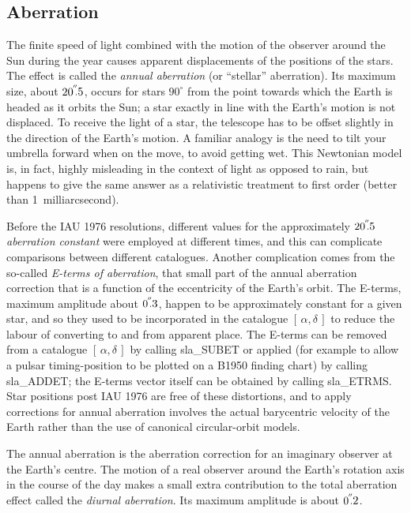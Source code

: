 \documentclass[11pt,twoside]{article}
\newcommand{\radec}     {$[\,\alpha,\delta\,]$}
\newcommand{\arcsec}[2] {\arcseci{#1}$\hspace{-0.4em}.#2$}
\newcommand{\arcsec}[2] {
      {$#1\hspace{-0.05em}^{'\hspace{-0.1em}'}\hspace{-0.4em}.#2$}
   }
\newcommand{\arcseci}[1] {$#1\hspace{-0.05em}$\raisebox{-0.5ex}
                         {$^{'\hspace{-0.1em}'}$}}
\renewcommand{\arcseci}[1] {$#1\hspace{-0.05em}^{'\hspace{-0.1em}'}$}
\begin{document}
\subsection{Aberration}
The finite speed of light combined with the motion of the observer
around the Sun during the year causes apparent displacements of
the positions of the stars.  The effect is called
the {\it annual aberration} (or ``stellar''
aberration).  Its maximum size, about \arcsec{20}{5},
occurs for stars $90^{\circ}$ from the point towards which
the Earth is headed as it orbits the Sun;  a star exactly in line with
the Earth's motion is not displaced.  To receive the light of
a star, the telescope has to be offset slightly in the direction of
the Earth's motion.  A familiar analogy is the need to tilt your
umbrella forward when on the move, to avoid getting wet.  This
Newtonian model is,
in fact, highly misleading in the context of light as opposed
to rain, but happens to give the same answer as a relativistic
treatment to first order (better than 1~milliarcsecond).

Before the IAU 1976 resolutions, different
values for the approximately
\arcsec{20}{5} {\it aberration constant}\/ were employed
at different times, and this can complicate comparisons
between different catalogues.  Another complication comes from
the so-called {\it E-terms of aberration},
that small part of the annual aberration correction that is a
function of the eccentricity of the Earth's orbit.  The E-terms,
maximum amplitude about \arcsec{0}{3},
happen to be approximately constant for a given star, and so they
used to be incorporated in the catalogue \radec\/
to reduce the labour of converting to and from apparent place.
The E-terms can be removed from a catalogue \radec\/ by
calling
sla\_SUBET
or applied (for example to allow a pulsar
timing-position to be plotted on a B1950 finding chart)
by calling
sla\_ADDET;
the E-terms vector itself can be obtained by calling
sla\_ETRMS.
Star positions post IAU 1976 are free of these distortions, and to
apply corrections for annual aberration involves the actual
barycentric velocity of the Earth rather than the use of
canonical circular-orbit models.

The annual aberration is the aberration correction for
an imaginary observer at the Earth's centre.
The motion of a real observer around the Earth's rotation axis in
the course of the day makes a small extra contribution to the total
aberration effect called the {\it diurnal aberration}.  Its
maximum amplitude is about \arcsec{0}{2}.
\end{document}
